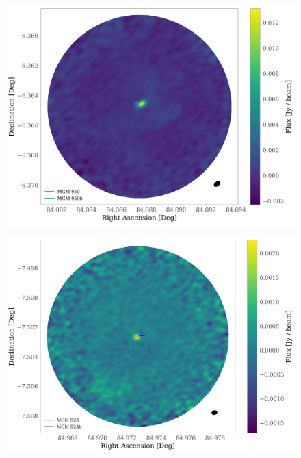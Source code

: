 \documentclass{aa}
\begin{document}
\begin{appendix}
\begin{figure}
\centering
   \includegraphics[width=\columnwidth]{MGM950.png}
    \caption{}
   \label{figure:MGM950}
\end{figure}

\begin{figure}
\centering
   \includegraphics[width=\columnwidth]{MGM523.png}
    \caption{}
    \label{figure:MGM523}
\end{figure}

\end{appendix}

 \label{table:catalog1}
 \label{table:stellarmass}
\end{document}
